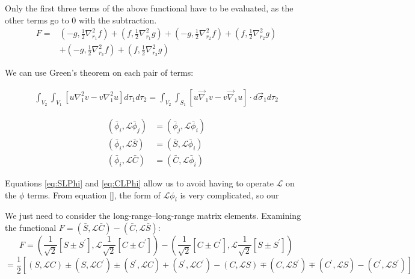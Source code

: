 \documentclass[Dissertation.tex]{subfiles}
\begin{document}
Only the first three terms of the above functional have to be evaluated, as the other terms go to 0 with the subtraction.
\begin{align}
	F=&\left({-g,\frac{1}{2} \nabla_{r_1}^2 f}\right)+\left({f,\frac{1}{2} \nabla_{r_1}^2 g}\right)+
	\left({-g,\frac{1}{2} \nabla_{r_2}^2 f}\right)+\left({f,\frac{1}{2} \nabla_{r_2}^2 g}\right) \nonumber \\
	&+\left({-g,\frac{1}{2} \nabla_{r_3}^2 f}\right)+\left({f,\frac{1}{2} \nabla_{r_3}^2 g}\right)
\end{align}

We can use Green's theorem on each pair of terms:


\begin{align}
	{\int _{V_2}{{\int_{V_1}{\left[{u{\nabla }_1^2 v-v{\nabla }_1^2 u}\right]{d \tau_1}}}{d \tau_2}}}
	= \int_{V_2} \int_{S_1} \left[u \vec{\nabla}_1 v - v \vec{\nabla}_1 u \right] \cdot d\vec{\sigma}_1 d\tau_2
\end{align}

\begin{subequations}
\label{eq:elem_symm}
\begin{align}
\left(\bar{\phi}_i, \mathcal{L} \bar{\phi}_j \right) &= \left(\bar{\phi}_j, \mathcal{L} \bar{\phi}_i \right) \\
\left(\bar{\phi}_i, \mathcal{L} \bar{S} \right) &= \left(\bar{S}, \mathcal{L} \bar{\phi}_i \right) \label{eq:SLPhi} \\
\left(\bar{\phi}_i, \mathcal{L} \bar{C} \right) &= \left(\bar{C}, \mathcal{L} \bar{\phi}_i \right) \label{eq:CLPhi}
\end{align}
\end{subequations}

\noindent Equations \ref{eq:SLPhi} and \ref{eq:CLPhi} allow us to avoid having to operate $\mathcal{L}$ on the $\phi$ terms. From equation \ref{}, the form of $\mathcal{L}\phi_i$ is very complicated, so our 

We just need to consider the long-range--long-range matrix elements. Examining the functional
 $F = \left(\bar{S}, \mathcal{L}\bar{C}\right) - \left(\bar{C}, \mathcal{L}\bar{S}\right)$:
\begin{equation*}
F = \left(\frac{1}{\sqrt{2}} \left[S \pm S^\prime \right], \mathcal{L} \frac{1}{\sqrt{2}}\left[C \pm C^\prime \right] \right) -
    \left(\frac{1}{\sqrt{2}} \left[C \pm C^\prime \right], \mathcal{L} \frac{1}{\sqrt{2}}\left[S \pm S^\prime \right] \right)
\end{equation*}
\begin{equation}
= \frac{1}{2}\left[(S,\mathcal{L}C) \pm (S,\mathcal{L}C^\prime) \pm (S^\prime,\mathcal{L}C) + (S^\prime,\mathcal{L}C^\prime) - (C,\mathcal{L}S) \mp (C,\mathcal{L}S^\prime) \mp (C^\prime,\mathcal{L}S) - (C^\prime,\mathcal{L}S^\prime)\right]
\end{equation}
\end{document}
